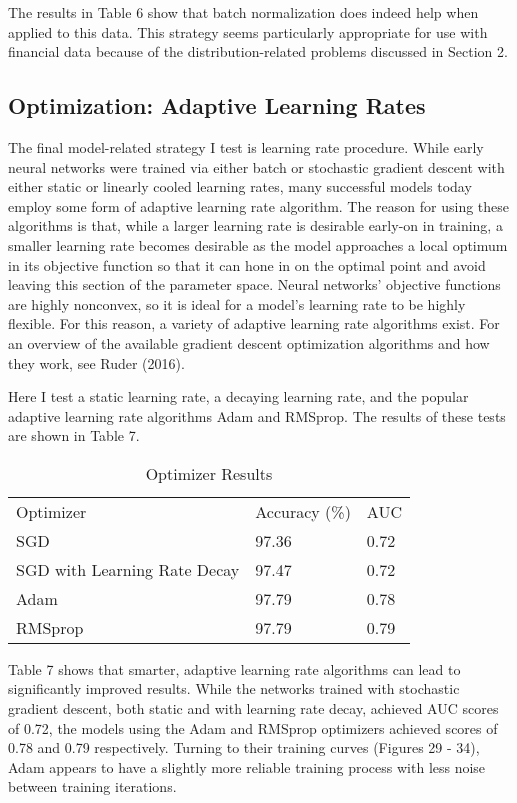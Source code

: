 \documentclass[12pt]{article}  %
\theoremstyle{definition}
\theoremstyle{remark}
\begin{document}
\par The results in Table 6 show that batch normalization does indeed help when applied to this data. This strategy seems particularly appropriate for use with financial data because of the distribution-related problems discussed in Section 2. 

\subsection{Optimization: Adaptive Learning Rates}
\par The final model-related strategy I test is learning rate procedure. While early neural networks were trained via either batch or stochastic gradient descent with either static or linearly cooled learning rates, many successful models today employ some form of adaptive learning rate algorithm. The reason for using these algorithms is that, while a larger learning rate is desirable early-on in training, a smaller learning rate becomes desirable as the model approaches a local optimum in its objective function  so that it can hone in on the optimal point and avoid leaving this section of the parameter space. Neural networks' objective functions are highly nonconvex, so it is ideal for a model's learning rate to be highly flexible. For this reason, a variety of adaptive learning rate algorithms exist. For an overview of the available gradient descent optimization algorithms and how they work, see Ruder (2016). 
\par Here I test a static learning rate, a decaying learning rate, and the popular adaptive learning rate algorithms Adam and RMSprop. The results of these tests are shown in Table 7. 

\begin{table}[!h]
\centering
\caption{Optimizer Results}
\label{my-label}
\begin{tabular}{lll}
Optimizer                    & Accuracy (\%) & AUC  \\
SGD                 & 97.36         & 0.72 \\
SGD with Learning Rate Decay & 97.47         & 0.72 \\
Adam                & 97.79         & 0.78 \\
RMSprop                      & 97.79         & 0.79
\end{tabular}
\end{table}

\par Table 7 shows that smarter, adaptive learning rate algorithms can lead to significantly improved results. While the networks trained with stochastic gradient descent, both static and with learning rate decay, achieved AUC scores of 0.72, the models using the Adam and RMSprop optimizers achieved scores of 0.78 and 0.79 respectively. Turning to their training curves (Figures 29 - 34), Adam appears to have a slightly more reliable training process with less noise between training iterations. 
\end{document}
